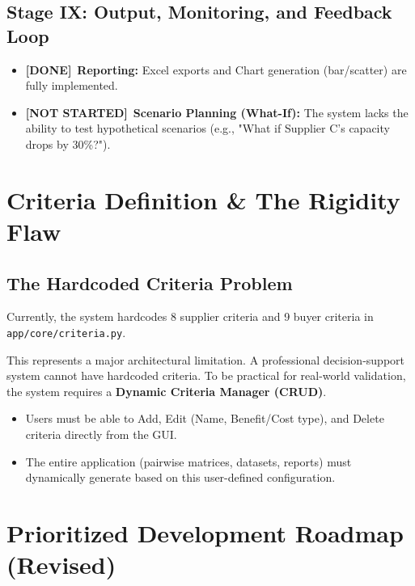 \documentclass[11pt]{article}
\newcommand{\done}{\textcolor{done}{\textbf{[DONE]}}}
\newcommand{\notdone}{\textcolor{notdone}{\textbf{[NOT STARTED]}}}
\begin{document}
\subsection{Stage IX: Output, Monitoring, and Feedback Loop}
\label{sec:stage9}
\begin{itemize}
    \item \done\ \textbf{Reporting:} Excel exports and Chart generation (bar/scatter) are fully implemented.
    \item \notdone\ \textbf{Scenario Planning (What-If):} The system lacks the ability to test hypothetical scenarios (e.g., "What if Supplier C's capacity drops by 30\%?").
\end{itemize}

\section{Criteria Definition \& The Rigidity Flaw}

\subsection{The Hardcoded Criteria Problem}
Currently, the system hardcodes 8 supplier criteria and 9 buyer criteria in \texttt{app/core/criteria.py}. 

This represents a major architectural limitation. A professional decision-support system cannot have hardcoded criteria. To be practical for real-world validation, the system requires a \textbf{Dynamic Criteria Manager (CRUD)}. 
\begin{itemize}
    \item Users must be able to Add, Edit (Name, Benefit/Cost type), and Delete criteria directly from the GUI.
    \item The entire application (pairwise matrices, datasets, reports) must dynamically generate based on this user-defined configuration.
\end{itemize}

\section{Prioritized Development Roadmap (Revised)}
\end{document}
